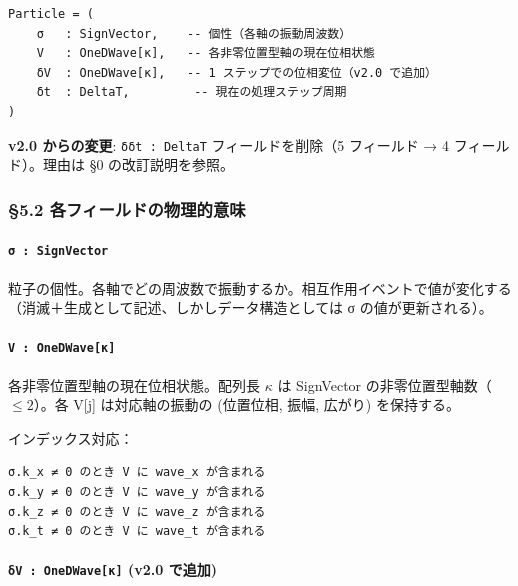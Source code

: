 \documentclass[a4paper,11pt]{ltjsarticle}
\begin{document}
\begin{verbatim}
Particle = (
    σ   : SignVector,    -- 個性（各軸の振動周波数）
    V   : OneDWave[κ],   -- 各非零位置型軸の現在位相状態
    δV  : OneDWave[κ],   -- 1 ステップでの位相変位（v2.0 で追加）
    δt  : DeltaT,         -- 現在の処理ステップ周期
)
\end{verbatim}

\textbf{v2.0 からの変更}: \texttt{δδt\ :\ DeltaT} フィールドを削除（5
フィールド → 4 フィールド）。理由は §0 の改訂説明を参照。

\subsubsection{§5.2
各フィールドの物理的意味}\label{ux5404ux30d5ux30a3ux30fcux30ebux30c9ux306eux7269ux7406ux7684ux610fux5473}

\paragraph{\texorpdfstring{\texttt{σ\ :\ SignVector}}{σ : SignVector}}\label{ux3c3-signvector}

粒子の個性。各軸でどの周波数で振動するか。相互作用イベントで値が変化する（消滅＋生成として記述、しかしデータ構造としては
σ の値が更新される）。

\paragraph{\texorpdfstring{\texttt{V\ :\ OneDWave{[}κ{]}}}{V : OneDWave{[}κ{]}}}\label{v-onedwaveux3ba}

各非零位置型軸の現在位相状態。配列長 \(\kappa\) は SignVector
の非零位置型軸数（\(\leq 2\)）。各 V{[}j{]} は対応軸の振動の (位置位相,
振幅, 広がり) を保持する。

インデックス対応：

\begin{verbatim}
σ.k_x ≠ 0 のとき V に wave_x が含まれる
σ.k_y ≠ 0 のとき V に wave_y が含まれる
σ.k_z ≠ 0 のとき V に wave_z が含まれる
σ.k_t ≠ 0 のとき V に wave_t が含まれる
\end{verbatim}

\paragraph{\texorpdfstring{\texttt{δV\ :\ OneDWave{[}κ{]}} (v2.0
で追加)}{δV : OneDWave{[}κ{]} (v2.0 で追加)}}\label{ux3b4v-onedwaveux3ba-v2.0-ux3067ux8ffdux52a0}
\end{document}
